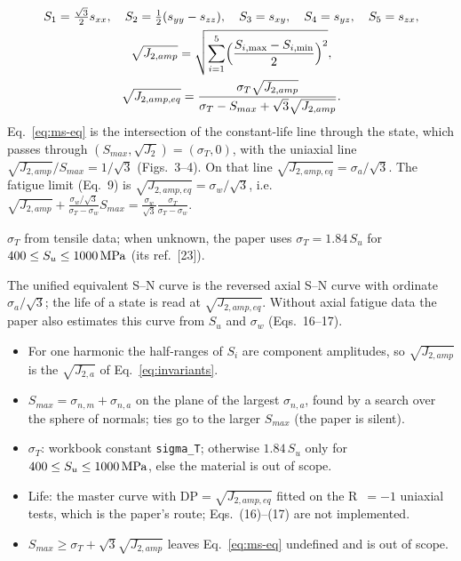 \begin{gather}
S_1=\tfrac{\sqrt3}{2}s_{xx},\quad S_2=\tfrac12(s_{yy}-s_{zz}),\quad S_3=s_{xy},\quad S_4=s_{yz},\quad S_5=s_{zx},
\label{eq:ms-basis}\\
\sqrt{J_{2,amp}}=\sqrt{\sum_{i=1}^{5}\Bigl(\frac{S_{i,\max}-S_{i,\min}}{2}\Bigr)^2} ,
\label{eq:ms-j2}\\
\sqrt{J_{2,amp,eq}} = \frac{\sigma_T\sqrt{J_{2,amp}}}{\sigma_T - S_{max} + \sqrt3\sqrt{J_{2,amp}}} .
\label{eq:ms-eq}
\end{gather}
Eq.~\eqref{eq:ms-eq} is the intersection of the constant-life line through the state, which passes
through $(S_{max},\sqrt{J_2})=(\sigma_T,0)$, with the uniaxial line $\sqrt{J_{2,amp}}/S_{max}=1/\sqrt3$
(Figs.~3--4). On that line $\sqrt{J_{2,amp,eq}}=\sigma_a/\sqrt3$. The fatigue limit (Eq.~9) is
$\sqrt{J_{2,amp,eq}}=\sigma_w/\sqrt3$, i.e.
$\sqrt{J_{2,amp}} + \frac{\sigma_w/\sqrt3}{\sigma_T-\sigma_w}S_{max} = \frac{\sigma_w}{\sqrt3}\frac{\sigma_T}{\sigma_T-\sigma_w}$.

 $\sigma_T$ from tensile data; when unknown, the paper uses
$\sigma_T=1.84\,S_u$ for $400\le S_u\le1000\,\mathrm{MPa}$ (its ref.~[23]).

 The unified equivalent S--N curve is the reversed axial S--N curve with ordinate
$\sigma_a/\sqrt3$; the life of a state is read at $\sqrt{J_{2,amp,eq}}$. Without axial fatigue data the
paper also estimates this curve from $S_u$ and $\sigma_w$ (Eqs.~16--17).

\begin{itemize}
\item For one harmonic the half-ranges of $S_i$ are component amplitudes, so $\sqrt{J_{2,amp}}$ is
  the $\sqrt{J_{2,a}}$ of Eq.~\eqref{eq:invariants}.
\item $S_{max}=\sigma_{n,m}+\sigma_{n,a}$ on the plane of the largest $\sigma_{n,a}$, found by a
  search over the sphere of normals; ties go to the larger $S_{max}$ (the paper is silent).
\item $\sigma_T$: workbook constant \texttt{sigma\_T}; otherwise $1.84\,S_u$ only for
  $400\le S_u\le1000\,\mathrm{MPa}$, else the material is out of scope.
\item Life: the master curve with $\mathrm{DP}=\sqrt{J_{2,amp,eq}}$ fitted on the R~$=-1$ uniaxial
  tests, which is the paper's route; Eqs.~(16)--(17) are not implemented.
\item $S_{max}\ge\sigma_T+\sqrt3\sqrt{J_{2,amp}}$ leaves Eq.~\eqref{eq:ms-eq} undefined and is out of scope.
\end{itemize}

